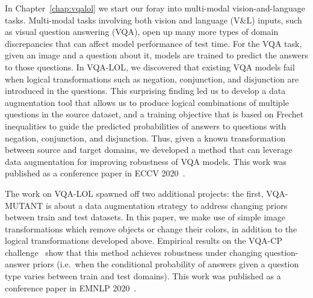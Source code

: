 In Chapter~\ref{chap:vqalol} we start our foray into multi-modal vision-and-language tasks.
Multi-modal tasks involving both vision and language (V\&L) inputs, such as visual question answering (VQA), open up many more types of domain discrepancies that can affect model performance of test time.
For the VQA task, given an image and a question about it, models are trained to predict the answers to those questions.
In VQA-LOL, we discovered that existing VQA models fail when logical transformations such as negation, conjunction, and disjunction are introduced in the questions.
This surprising finding led us to develop a data augmentation tool that allows us to produce logical combinations of multiple questions in the source dataset, and a training objective that is based on Frechet inequalities to guide the predicted probabilities of answers to questions with negation, conjunction, and disjunction.
Thus, given a known transformation between source and target domains, we developed a method that can leverage data augmentation for improving robustness of VQA models.
This work was published as a conference paper in ECCV 2020~\citep{gokhale2020vqa}.
%
%
%
%

The work on VQA-LOL spawned off two additional projects: the first, VQA-MUTANT is about a data augmentation strategy to address changing priors between train and test datasets.
In this paper, we make use of simple image transformations which remove objects or change their colors, in addition to the logical transformations developed above. Empirical results  on the VQA-CP challenge~\citep{agrawal2018don} show that this method achieves robustness under changing question-answer priors (i.e.~when the conditional probability of answers given a question type varies between train and test domains).
This work was published as a conference paper in EMNLP 2020~\citep{gokhale2020mutant}.
%
%
%
%

